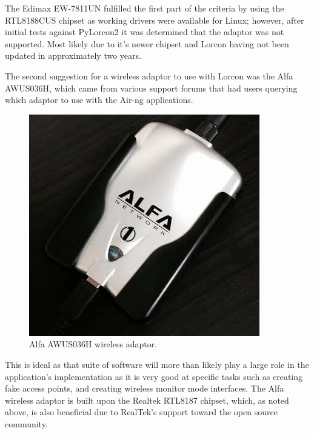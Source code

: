 The Edimax EW-7811UN fulfilled the first part of the criteria by using the RTL8188CUS chipset as working drivers were available for Linux; however, after initial tests against PyLorcon2 it was determined that the adaptor was not supported. Most likely due to it's newer chipset and Lorcon having not been updated in approximately two years. 

The second suggestion for a wireless adaptor to use with Lorcon was the Alfa AWUS036H, which came from various support forums that had users querying which adaptor to use with the Air-ng applications.  

\begin{figure}[h!]
\centering\includegraphics{research/figures/alfa.png}
\caption{Alfa AWUS036H wireless adaptor.}
\label{research:fig-alfa}
\end{figure}
\newpage
This is ideal as that suite of software will more than likely play a large role in the application's implementation as it is very good at specific tasks such as creating fake access points, and creating wireless monitor mode interfaces. The Alfa wireless adaptor is built upon the Realtek RTL8187 chipset, which, as noted above, is also beneficial due to RealTek's support toward the open source community.